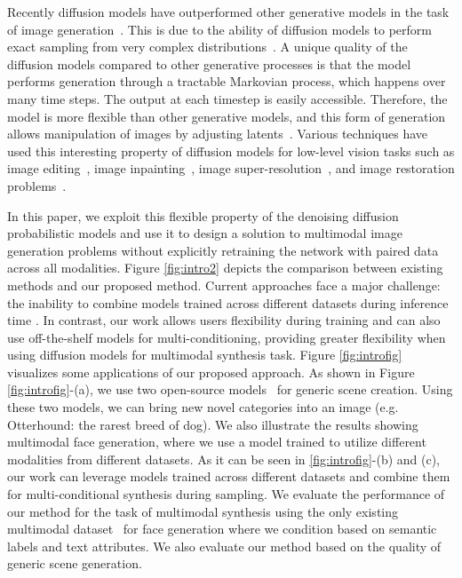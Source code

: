 \documentclass[10pt,twocolumn,letterpaper]{article}
\begin{document}
Recently diffusion models have outperformed other generative models in the task of image generation~\cite{dhariwal2021diffusion,ho2020denoising}. This is due to the ability of diffusion models to perform exact sampling from very complex distributions~\cite{sohl2015deep}. A unique quality of the diffusion models compared to other generative processes is that the model performs generation through a tractable Markovian process, which happens over many time steps. The output at each timestep is easily accessible. Therefore, the model is more flexible than other generative models, and this form of generation allows manipulation of images by adjusting latents~\cite{avrahami2022blended,dhariwal2021diffusion,preechakul2022diffusion}. Various techniques have used this interesting property of diffusion models for low-level vision tasks such as image editing~\cite{avrahami2022blended,kawar2022imagic}, image inpainting~\cite{lugmayr2022repaint}, image super-resolution~\cite{choi2021ilvr}, and image restoration problems~\cite{kawar2022denoising}. 

In this paper, we exploit this flexible property of the denoising diffusion probabilistic models and use it to design a solution to multimodal image generation problems without explicitly retraining the network with paired data across all modalities. Figure \ref{fig:intro2} depicts the comparison between existing methods and our proposed method. Current approaches face a major challenge: the inability to combine models trained across different datasets during inference time \cite{liu2022compositional,ho2020denoising}. In contrast, our work allows users flexibility during training and can also use off-the-shelf models for multi-conditioning, providing greater flexibility when using diffusion models for multimodal synthesis task.
Figure \ref{fig:introfig} visualizes some applications of our proposed approach. As shown in Figure  \ref{fig:introfig}-(a), we use two open-source models~\cite{nichol2021glide,dhariwal2021diffusion} for generic scene creation.  Using these two models, we can bring new novel categories into an image (e.g. Otterhound: the rarest breed of dog). We also illustrate the results showing multimodal face generation, where we use a model trained to utilize different modalities from different datasets. As it can be seen in \ref{fig:introfig}-(b) and (c), our work can leverage models trained across different datasets and combine them for multi-conditional synthesis during sampling. We  evaluate the performance of our method for the task of multimodal synthesis using the only existing multimodal dataset~\cite{xia2021tedigan} for face generation where we condition based on semantic labels and text attributes. We also evaluate our method based on the quality of generic scene generation. 
\end{document}
